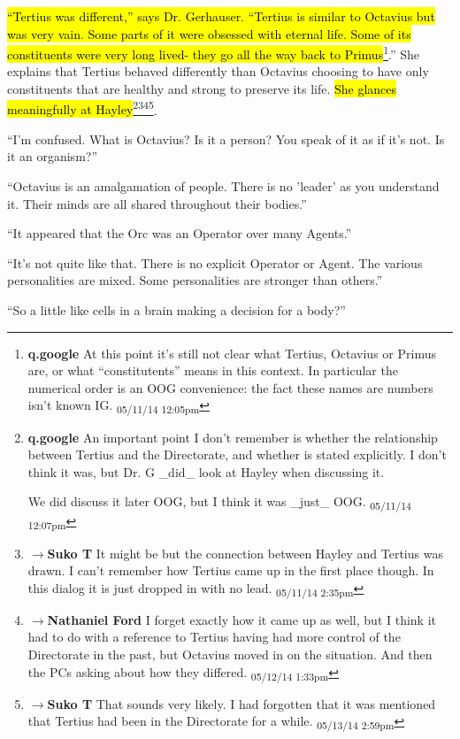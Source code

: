 \hl{``Tertius was different,'' says Dr. Gerhauser.  ``Tertius is similar to Octavius but was very vain.  Some parts of it were obsessed with eternal life.  Some of its constituents were very long lived- they go all the way back to Primus}\footnote{\textbf{q.google }At this point it's still not clear what Tertius, Octavius or Primus are, or what ``constitutents'' means in this context.  In particular the numerical order is an OOG convenience: the fact these names are numbers isn't known IG. \textsubscript{05/11/14 12:05pm}}.''  She explains that Tertius behaved differently than Octavius choosing to have only constituents that are healthy and strong to preserve its life.  \hl{She glances meaningfully at Hayley}\footnote{\textbf{q.google }An important point I don't remember is whether the relationship between Tertius and the Directorate, and whether is stated explicitly.  I don't think it was, but Dr. G \_did\_ look at Hayley when discussing it.

We did discuss it later OOG, but I think it was \_just\_ OOG. \textsubscript{05/11/14 12:07pm}}\footnote{$\rightarrow$\textbf{Suko T }It might be but the connection between Hayley and Tertius was drawn. I can't remember how Tertius came up in the first place though.  In this dialog it is just dropped in with no lead. \textsubscript{05/11/14 2:35pm}}\footnote{$\rightarrow$\textbf{Nathaniel Ford }I forget exactly how it came up as well, but I think it had to do with a reference to Tertius having had more control of the Directorate in the past, but Octavius moved in on the situation. And then the PCs asking about how they differed. \textsubscript{05/12/14 1:33pm}}\footnote{$\rightarrow$\textbf{Suko T }That sounds very likely.  I had forgotten that it was mentioned that Tertius had been in the Directorate for a while. \textsubscript{05/13/14 2:59pm}}.

``I'm confused.  What is Octavius?  Is it a person?  You speak of it as if it's not.  Is it an organism?''

``Octavius is an amalgamation of people.  There is no 'leader' as you understand it.  Their minds are all shared throughout their bodies.''

``It appeared that the Orc was an Operator over many Agents.''

``It's not quite like that.  There is no explicit Operator or Agent.  The various personalities are mixed.  Some personalities are stronger than others.''

``So a little like cells in a brain making a decision for a body?''

